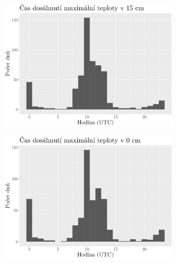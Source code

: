 \begin{figure}
	\centering
	\begin{subfigure}{0.45\textwidth}
  \includegraphics[width=\textwidth]{img/hist_hourmax15cm.png}
		\caption{}
		\label{fig:hourmax15cm}
	\end{subfigure}
	\hfill
	\begin{subfigure}{0.45\textwidth}
  \includegraphics[width=\textwidth]{img/hist_hourmax0cm.png}
		\caption{}
		\label{fig:hourmax0cm}
	\end{subfigure}
	\hfill
	\begin{subfigure}{0.45\textwidth}

\end{subfigure}
\end{figure}
